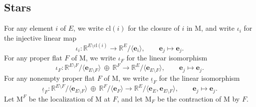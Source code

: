\documentclass[11pt,reqno]{amsart}
\theoremstyle{definition}
\theoremstyle{remark}
\renewcommand{\(}{\left(}
\renewcommand{\)}{\right)}
\newcommand{\<}{\left<}
\renewcommand{\>}{\right>}
\begin{document}
\subsection{Stars}\label{sec:stars}

For any element $i$ of $E$, we write $\text{cl}(i)$ for the closure of $i$ in $\mathrm{M}$, and write $\iota_i$  for the injective linear map
\[
\iota_i:\mathbb{R}^{E \setminus \text{cl}(i)} \longrightarrow \mathbb{R}^{E}/\langle \mathbf{e}_i \rangle, \qquad \mathbf{e}_j \longmapsto \mathbf{e}_j.
\]
For any proper flat $F$ of $\mathrm{M}$, we write $\iota_F$ for the  linear isomorphism
\[
\iota_F:\mathbb{R}^{E \setminus F} / \langle \mathbf{e}_{E \setminus F} \rangle\ \oplus \ \mathbb{R}^F \longrightarrow \mathbb{R}^E  / \langle \mathbf{e}_{E \setminus F} \rangle,  \qquad \mathbf{e}_j \longmapsto \mathbf{e}_j.
\]
For any nonempty proper flat $F$ of $\mathrm{M}$, we write $\underline{\iota}_F$ for the linear isomorphism
\[
\underline{\iota}_F:\mathbb{R}^{E \setminus F} / \langle \mathbf{e}_{E \setminus F} \rangle\ \oplus \ \mathbb{R}^F/ \langle \mathbf{e}_F \rangle \longrightarrow \mathbb{R}^E  / \langle \mathbf{e}_E, \mathbf{e}_{E \setminus F} \rangle,  \qquad \mathbf{e}_j \longmapsto \mathbf{e}_j.
\]
Let $\mathrm{M}^F$ be the localization of $\mathrm{M}$ at $F$,
and let $\mathrm{M}_F$ be the contraction of $\mathrm{M}$ by $F$.
\end{document}
